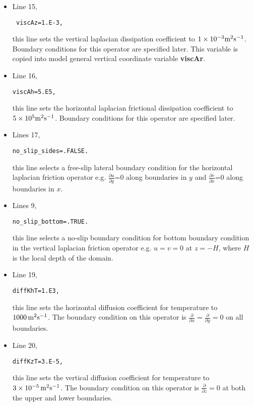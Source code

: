 {\begin{itemize}
\item Line 15, 
\begin{verbatim} viscAz=1.E-3, \end{verbatim}
this line sets the vertical laplacian dissipation coefficient to
$1 \times 10^{-3} {\rm m^{2}s^{-1}}$. Boundary conditions
for this operator are specified later. This variable is copied into
model general vertical coordinate variable {\bf viscAr}.


\item Line 16, 
\begin{verbatim}
viscAh=5.E5,
\end{verbatim} 
this line sets the horizontal laplacian frictional dissipation coefficient to
$5 \times 10^{5} {\rm m^{2}s^{-1}}$. Boundary conditions
for this operator are specified later.

\item Lines 17,
\begin{verbatim}
no_slip_sides=.FALSE.
\end{verbatim}
this line selects a free-slip lateral boundary condition for
the horizontal laplacian friction operator 
e.g. $\frac{\partial u}{\partial y}$=0 along boundaries in $y$ and
$\frac{\partial v}{\partial x}$=0 along boundaries in $x$.

\item Lines 9,
\begin{verbatim}
no_slip_bottom=.TRUE.
\end{verbatim}
this line selects a no-slip boundary condition for bottom
boundary condition in the vertical laplacian friction operator 
e.g. $u=v=0$ at $z=-H$, where $H$ is the local depth of the domain.

\item Line 19,
\begin{verbatim}
diffKhT=1.E3,
\end{verbatim}
this line sets the horizontal diffusion coefficient for temperature
to $1000\,{\rm m^{2}s^{-1}}$. The boundary condition on this
operator is $\frac{\partial}{\partial x}=\frac{\partial}{\partial y}=0$ on
all boundaries.

\item Line 20,
\begin{verbatim}
diffKzT=3.E-5,
\end{verbatim}
this line sets the vertical diffusion coefficient for temperature
to $3 \times 10^{-5}\,{\rm m^{2}s^{-1}}$. The boundary 
condition on this operator is $\frac{\partial}{\partial z}=0$ at both
the upper and lower boundaries.


\end{itemize}}
